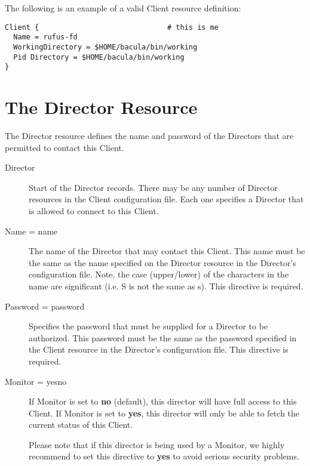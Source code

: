 The following is an example of a valid Client resource definition: 

\footnotesize
\begin{verbatim}
Client {                              # this is me
  Name = rufus-fd
  WorkingDirectory = $HOME/bacula/bin/working
  Pid Directory = $HOME/bacula/bin/working
}
\end{verbatim}
\normalsize

\section{The Director Resource}
\label{DirectorResource}

The Director resource defines the name and password of the Directors that are
permitted to contact this Client. 

\begin{description}

\item [Director]
   Start of the Director records. There may be any  number of Director resources
   in the Client configuration file. Each  one specifies a Director that is
   allowed to connect to this  Client. 

\item [Name = \lt{}name\gt{}]
   The name of the Director  that may contact this Client. This name must be the 
   same as the name specified on the Director resource  in the Director's
   configuration file. Note, the case (upper/lower) of the characters in
   the name are significant (i.e. S is not the same as s). This directive
   is required. 

\item [Password = \lt{}password\gt{}]
   Specifies the password that must be  supplied for a Director to be authorized.
This password  must be the same as the password specified in the  Client
resource in the Director's configuration file.  This directive is required. 

\item [Monitor = \lt{}yes\vb{}no\gt{}]
   If Monitor is set to {\bf no} (default),  this director will have full access
   to this Client. If Monitor is set to  {\bf yes}, this director will only be
   able to fetch the current status  of this Client.

   Please note that if this director is being used by a Monitor, we highly 
   recommend to set this directive to {\bf yes} to avoid serious security 
   problems. 
\end{description}

